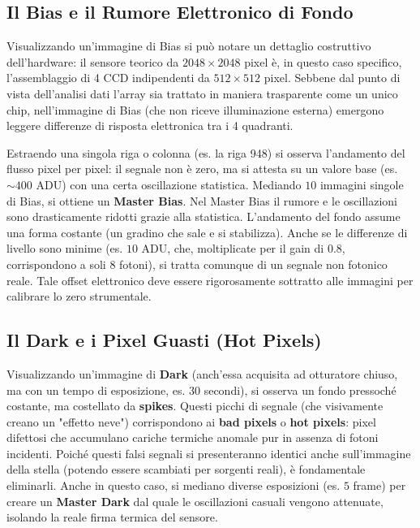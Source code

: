 \subsection{Il Bias e il Rumore Elettronico di Fondo}
Visualizzando un'immagine di Bias si può notare un dettaglio costruttivo dell'hardware: il sensore teorico da $2048 \times 2048$ pixel è, in questo caso specifico, l'assemblaggio di 4 CCD indipendenti da $512 \times 512$ pixel. Sebbene dal punto di vista dell'analisi dati l'array sia trattato in maniera trasparente come un unico chip, nell'immagine di Bias (che non riceve illuminazione esterna) emergono leggere differenze di risposta elettronica tra i 4 quadranti.

Estraendo una singola riga o colonna (es. la riga 948) si osserva l'andamento del flusso pixel per pixel: il segnale non è zero, ma si attesta su un valore base (es. $\sim 400 \text{ ADU}$) con una certa oscillazione statistica.
Mediando $10$ immagini singole di Bias, si ottiene un \textbf{Master Bias}. Nel Master Bias il rumore e le oscillazioni sono drasticamente ridotti grazie alla statistica.
L'andamento del fondo assume una forma costante (un gradino che sale e si stabilizza). Anche se le differenze di livello sono minime (es. $10 \text{ ADU}$, che, moltiplicate per il gain di $0.8$, corrispondono a soli $8$ fotoni), si tratta comunque di un segnale non fotonico reale. Tale offset elettronico deve essere rigorosamente sottratto alle immagini per calibrare lo zero strumentale.

\subsection{Il Dark e i Pixel Guasti (Hot Pixels)}
Visualizzando un'immagine di \textbf{Dark} (anch'essa acquisita ad otturatore chiuso, ma con un tempo di esposizione, es. $30$ secondi), si osserva un fondo pressoché costante, ma costellato da \textbf{spikes}. Questi picchi di segnale (che visivamente creano un "effetto neve") corrispondono ai \textbf{bad pixels} o \textbf{hot pixels}: pixel difettosi che accumulano cariche termiche anomale pur in assenza di fotoni incidenti.
Poiché questi falsi segnali si presenteranno identici anche sull'immagine della stella (potendo essere scambiati per sorgenti reali), è fondamentale eliminarli. Anche in questo caso, si mediano diverse esposizioni (es. $5$ frame) per creare un \textbf{Master Dark} dal quale le oscillazioni casuali vengono attenuate, isolando la reale firma termica del sensore.

